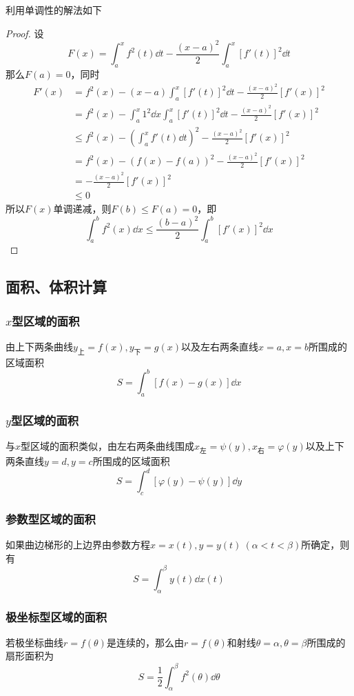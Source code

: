 利用单调性的解法如下
\begin{proof}
    设
    \[ F(x) = \int_a^xf^2(t)\dd{t} - \frac{(x-a)^2}{2}\int_a^x[f'(t)]^2\dd{t} \]
    那么$F(a)=0$，同时
    \begin{align*}
        F'(x)
         & = f^2(x) - (x-a)\int_a^x[f'(t)]^2\dd{t} - \frac{(x-a)^2}{2}[f'(x)]^2              \\
         & = f^2(x) - \int_a^x 1^2\dd{x}\int_a^x[f'(t)]^2\dd{t} - \frac{(x-a)^2}{2}[f'(x)]^2 \\
         & \leq f^2(x) - \left(\int_a^xf'(t)\dd{t}\right)^2 - \frac{(x-a)^2}{2}[f'(x)]^2     \\
         & =f^2(x) - (f(x)-f(a))^2 - \frac{(x-a)^2}{2}[f'(x)]^2                              \\
         & =- \frac{(x-a)^2}{2}[f'(x)]^2                                                     \\
         & \leq 0
    \end{align*}
    所以$F(x)$单调递减，则$F(b) \leq F(a) = 0$，即
    \[ \int_a^b f^2(x)\dd{x} \leq \frac{(b-a)^2}{2}\int_a^b[f'(x)]^2\dd{x} \]
\end{proof}

\subsection{面积、体积计算}
\subsubsection{\texorpdfstring{$x$}{x}型区域的面积}
由上下两条曲线$y_\text{上}=f(x),y_\text{下}=g(x)$以及左右两条直线$x=a,x=b$所围成的区域面积
\[ S = \int_a^b [f(x)-g(x)]\dd{x} \]

\subsubsection{\texorpdfstring{$y$}{x}型区域的面积}
与$x$型区域的面积类似，由左右两条曲线围成$x_\text{左}=\psi(y),x_\text{右}=\varphi(y)$以及上下两条直线$y=d,y=c$所围成的区域面积
\[ S = \int_c^d [\varphi(y)-\psi(y)]\dd{y} \]

\subsubsection{参数型区域的面积}
如果曲边梯形的上边界由参数方程$x=x(t),y=y(t)\ (\alpha<t<\beta)$所确定，则有
\[ S = \int_\alpha^\beta y(t)\dd{x}(t) \]

\subsubsection{极坐标型区域的面积}
若极坐标曲线$r=f(\theta)$是连续的，那么由$r=f(\theta)$和射线$\theta=\alpha,\theta=\beta$所围成的扇形面积为
\[ S = \frac{1}{2}\int_\alpha^\beta f^2(\theta)\dd{\theta} \]

